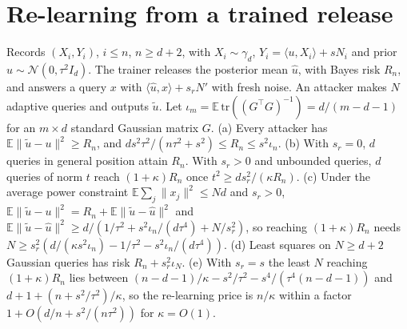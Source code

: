 \section{Re-learning from a trained release}

\begin{theorem}
Records $(X_i,Y_i)$, $i\le n$, $n\ge d+2$, with $X_i\sim\gamma_d$,
$Y_i=\langle u,X_i\rangle+sN_i$ and prior $u\sim\mathcal N(0,\tau^2I_d)$. The trainer
releases the posterior mean $\hat u$, with Bayes risk $R_n$, and answers a query $x$
with $\langle\hat u,x\rangle+s_rN'$ with fresh noise. An attacker makes $N$ adaptive
queries and outputs $\tilde u$. Let $\iota_m=\mathbb E\,\mathrm{tr}((G^\top G)^{-1})=d/(m-d-1)$
for an $m\times d$ standard Gaussian matrix $G$. (a) Every attacker has
$\mathbb E\lVert\tilde u-u\rVert^2\ge R_n$, and
$ds^2\tau^2/(n\tau^2+s^2)\le R_n\le s^2\iota_n$. (b) With $s_r=0$, $d$ queries in
general position attain $R_n$. With $s_r>0$ and unbounded queries, $d$ queries of norm
$t$ reach $(1+\kappa)R_n$ once $t^2\ge ds_r^2/(\kappa R_n)$. (c) Under the average power
constraint $\mathbb E\sum_j\lVert x_j\rVert^2\le Nd$ and $s_r>0$,
$\mathbb E\lVert\tilde u-u\rVert^2=R_n+\mathbb E\lVert\tilde u-\hat u\rVert^2$ and
$\mathbb E\lVert\tilde u-\hat u\rVert^2\ge d/(1/\tau^2+s^2\iota_n/(d\tau^4)+N/s_r^2)$,
so reaching $(1+\kappa)R_n$ needs
$N\ge s_r^2(d/(\kappa s^2\iota_n)-1/\tau^2-s^2\iota_n/(d\tau^4))$. (d) Least squares on
$N\ge d+2$ Gaussian queries has risk $R_n+s_r^2\iota_N$. (e) With $s_r=s$ the least $N$
reaching $(1+\kappa)R_n$ lies between $(n-d-1)/\kappa-s^2/\tau^2-s^4/(\tau^4(n-d-1))$
and $d+1+(n+s^2/\tau^2)/\kappa$, so the re-learning price is $n/\kappa$ within a factor
$1+O(d/n+s^2/(n\tau^2))$ for $\kappa=O(1)$.
\end{theorem}
